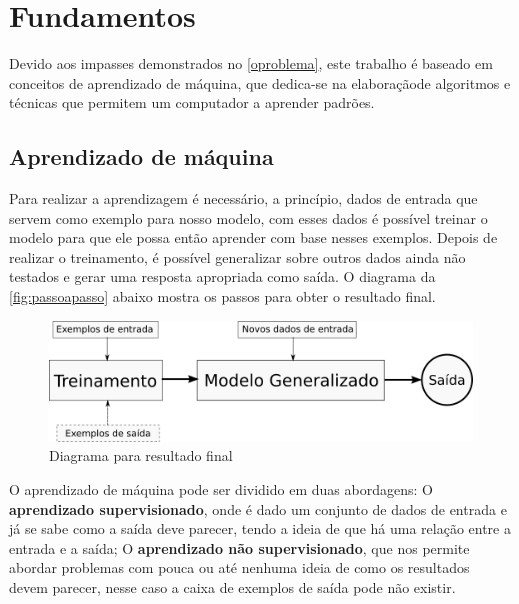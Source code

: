 \chapter{Fundamentos}\label{fundamentos}

Devido aos impasses demonstrados no \autoref{oproblema}, este trabalho é baseado em conceitos de aprendizado de máquina, que dedica-se na elaboraçãode algoritmos e técnicas que permitem um computador a aprender padrões.  

\section{Aprendizado de máquina}\label{sec:aprendizadodemaquina}

Para realizar a aprendizagem é necessário, a princípio, dados de entrada que servem como exemplo para nosso modelo, com esses dados é possível treinar o modelo para que ele possa então aprender com base nesses exemplos. Depois de realizar o treinamento, é possível generalizar sobre outros dados ainda não testados e gerar uma resposta apropriada como saída. O diagrama da \autoref{fig:passoapasso} abaixo mostra os passos para obter o resultado final.

\begin{figure}[htb]
	  \caption{Diagrama para resultado final}\label{fig:passoapasso}
	  \begin{center}
	      \includegraphics[scale=0.5]{img/passoapasso}
	  \end{center}
\end{figure}


O aprendizado de máquina pode ser dividido em duas abordagens: O \textbf{aprendizado supervisionado}, onde é dado um conjunto de dados de entrada e já se sabe como a saída deve parecer, tendo a ideia de que há uma relação entre a entrada e a saída; O \textbf{aprendizado não supervisionado}, que nos permite abordar problemas com pouca ou até nenhuma ideia de como os resultados devem parecer, nesse caso a caixa de exemplos de saída pode não existir.

